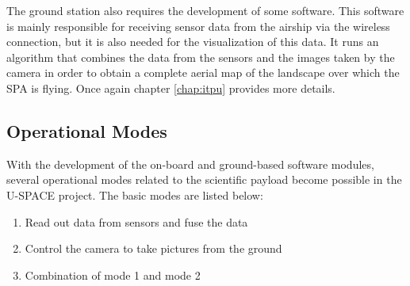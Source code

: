 The ground station also requires the development of some software. This software is mainly responsible for receiving sensor data from the airship via the wireless connection, but it is also needed for the visualization of this data. It runs an algorithm that combines the data from the sensors and the images taken by the camera in order to obtain a complete aerial map of the landscape over which the \ac{SPA} is flying. Once again chapter \ref{chap:itpu} provides more details.

\subsection{Operational Modes}

With the development of the on-board and ground-based software modules, several operational modes related to the scientific payload become possible in the \ac{U-SPACE} project. The basic modes are listed below:

\begin{enumerate}
\item Read out data from sensors and fuse the data
\item Control the camera to take pictures from the ground
\item Combination of mode 1 and mode 2
\end{enumerate}